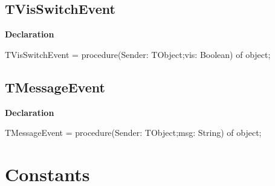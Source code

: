 \documentclass{report}
\newif\ifpdf
\begin{document}
\subsection*{TVisSwitchEvent}
\fi
\label{ipkhandle-TVisSwitchEvent}
\begin{list}{}{
\setlength{\itemindent}{0cm}
\setlength{\listparindent}{0cm}
\setlength{\leftmargin}{\evensidemargin}
\addtolength{\leftmargin}{\tmplength}
\settowidth{\labelsep}{X}
\addtolength{\leftmargin}{\labelsep}
\setlength{\labelwidth}{\tmplength}
}
\item[\textbf{Declaration}\hfill]
\ifpdf
\begin{flushleft}
\fi
\begin{ttfamily}
TVisSwitchEvent = procedure(Sender: TObject;vis: Boolean) of object;\end{ttfamily}

\ifpdf
\end{flushleft}
\fi

\end{list}
\ifpdf
\subsection*{\large{\textbf{TMessageEvent}}\normalsize\hspace{1ex}\hrulefill}
\else
\subsection*{TMessageEvent}
\fi
\label{ipkhandle-TMessageEvent}
\begin{list}{}{
\setlength{\itemindent}{0cm}
\setlength{\listparindent}{0cm}
\setlength{\leftmargin}{\evensidemargin}
\addtolength{\leftmargin}{\tmplength}
\settowidth{\labelsep}{X}
\addtolength{\leftmargin}{\labelsep}
\setlength{\labelwidth}{\tmplength}
}
\item[\textbf{Declaration}\hfill]
\ifpdf
\begin{flushleft}
\fi
\begin{ttfamily}
TMessageEvent = procedure(Sender: TObject;msg: String) of object;\end{ttfamily}

\ifpdf
\end{flushleft}
\fi

\end{list}
\section{Constants}
\ifpdf
\end{document}
